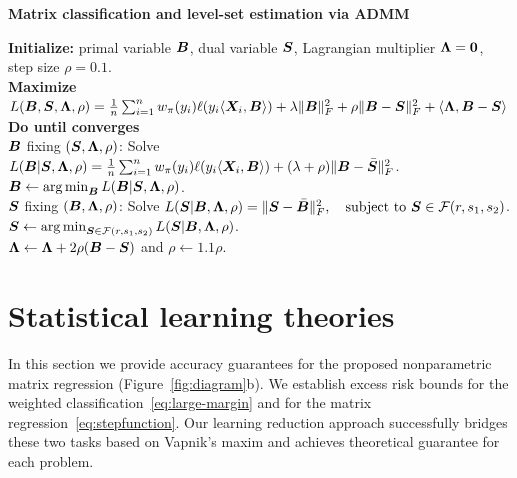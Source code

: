 \documentclass[11pt]{article}
\theoremstyle{definition}
\begin{document}
 \begin{algorithm}[h]
  \caption{{\bf Matrix classification and level-set estimation via ADMM} } \label{alg:weighted}
{\bf Initialize:} primal variable $\bm B$, dual variable $\bm S$, Lagrangian multiplier $\bm{\Lambda}=\mathbf{0}$, step size $\rho=0.1$.\\
{\bf Maximize} $
L(\bm B,\bm S,\bm{\Lambda},\rho)={1\over n}\sum_{i=1}^nw_\pi(y_i)\ell(y_i\langle \bm X_i,\bm B \rangle) + \lambda\lVert\bm B\rVert_F^2+\rho\lVert\bm B-\bm S\rVert_F^2+\langle \bm{\Lambda}, \bm B-\bm S\rangle$\\
{\bf Do until converges}\\[.1cm]
\hspace*{.2cm}{\bf Update} $\bm B$ fixing $(\bm S,\bm{\Lambda},\rho)$: Solve $L(\bm B|\bm S,\bm{\Lambda},\rho)={1\over n}\sum_{i=1}^n w_\pi(y_i)\ell(y_i\langle\bm X_i,\bm B\rangle)+(\lambda+\rho)\lVert\bm B-\bar {\bm S}\rVert_F^2$.\\
\hspace{.2cm} $\bm B \leftarrow \operatorname*{arg\,min}_{\bm B} L(\bm B|\bm S,\bm{\Lambda},\rho)$.\\[.2cm]
\hspace*{.2cm}{\bf Update} $\bm S$ fixing $(\bm B,\bm{\Lambda},\rho)$: Solve  $ L(\bm S|\bm B,\bm{\Lambda},\rho)=\lVert\bm S-\bar {\bm B}\rVert_F^2,\quad \text{subject to }\bm S\in\mathcal{F}(r,s_1,s_2)$.\\
\hspace{.2cm} $\bm S \leftarrow  \operatorname*{arg\,min}_{\bm S\in \mathcal{F}(r,s_1,s_2)}L(\bm S|\bm B,\bm{\Lambda},\rho)$.\\[.1cm]
\hspace*{.2cm}{\bf Update} $\bm{\Lambda} \leftarrow \bm{\Lambda}+2\rho(\bm B-\bm S)$ and  $\rho\leftarrow1.1\rho$.\\[.2cm]
\end{algorithm}


\vspace{-.3cm}
\section{Statistical learning theories}\label{sec:theory}
\vspace{-.5cm}
In this section we provide accuracy guarantees for the proposed nonparametric matrix regression (Figure~\ref{fig:diagram}b). We establish excess risk bounds for the weighted classification~\eqref{eq:large-margin} and for the matrix regression~\eqref{eq:stepfunction}. Our learning reduction approach successfully bridges these two tasks based on Vapnik’s maxim and achieves theoretical guarantee for each problem. 
\end{document}
